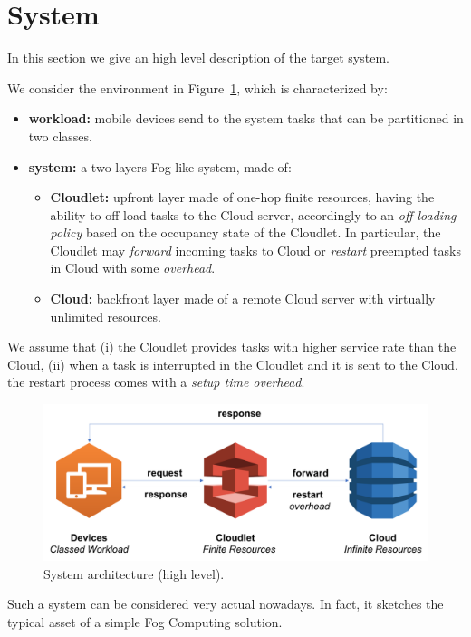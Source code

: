 \section{System}
\label{sec:system}

In this section we give an high level description of the target system.

We consider the environment in Figure~\ref{fig:system-architecture}, which is characterized by:

\begin{itemize}
	\item  \textbf{workload:} mobile devices send to the system tasks that can be partitioned in two classes.
	
	\item \textbf{system:} a two-layers Fog-like system, made of:	
	
	\begin{itemize}
		\item \textbf{Cloudlet:} upfront layer made of one-hop finite resources, having the ability to off-load tasks to the Cloud server, accordingly to an \textit{off-loading policy} based on the occupancy state of the Cloudlet. In particular, the Cloudlet may \textit{forward} incoming tasks to Cloud or \textit{restart} preempted tasks in Cloud with some \textit{overhead}.
		
		\item \textbf{Cloud:} backfront layer made of a remote Cloud server with virtually unlimited resources.
		
	\end{itemize}
\end{itemize}

We assume that
(i) the Cloudlet provides tasks with higher service rate than the Cloud, 
(ii) when a task is interrupted in the Cloudlet and it is sent to the Cloud, the restart process comes with a \textit{setup time overhead}.

\begin{figure}
	\includegraphics[width=\columnwidth]{fig/system-architecture}
	\caption{System architecture (high level).}
	\label{fig:system-architecture}
\end{figure}

Such a system can be considered very actual nowadays. In fact, it sketches the typical asset of a simple Fog Computing solution.